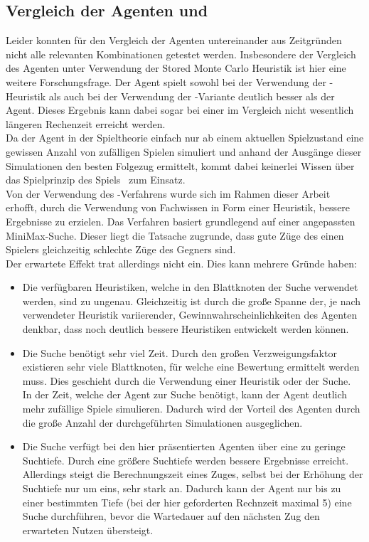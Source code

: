 \subsection{Vergleich der Agenten \mxZitat{\mc} und \mxZitat{\abp}}
\label{subsec:Fazit:AgentenVgl}
Leider konnten für den Vergleich der Agenten untereinander aus Zeitgründen nicht alle relevanten Kombinationen getestet werden. Insbesondere der Vergleich des \mxZitat{\abp} Agenten unter Verwendung der Stored Monte Carlo Heuristik ist hier eine weitere Forschungsfrage.
Der \mxZitat{\mc} Agent spielt sowohl bei der Verwendung der -Heuristik {\color{red}als auch bei der Verwendung der \mc -Variante} deutlich besser als der \mxZitat{\abp} Agent. Dieses Ergebnis kann dabei sogar bei einer im Vergleich nicht wesentlich längeren Rechenzeit erreicht werden.
\\Da der \mxZitat{\mc} Agent in der Spieltheorie einfach nur ab einem aktuellen Spielzustand eine gewissen Anzahl von zufälligen Spielen simuliert und anhand der Ausgänge dieser Simulationen den besten Folgezug ermittelt, kommt dabei keinerlei Wissen über das Spielprinzip des Spiels \ot\ zum Einsatz. 
\\Von der Verwendung des \mxZitat{\abab}-Verfahrens wurde sich im Rahmen dieser Arbeit erhofft, durch die Verwendung von Fachwissen in Form einer Heuristik, bessere Ergebnisse zu erzielen. Das Verfahren basiert grundlegend auf einer angepassten MiniMax-Suche. Dieser liegt die Tatsache zugrunde, dass gute Züge des einen Spielers gleichzeitig schlechte Züge des Gegners sind.
\\Der erwartete Effekt trat allerdings nicht ein. Dies kann mehrere Gründe haben:
\begin{itemize}
\item Die verfügbaren Heuristiken, welche in den Blattknoten der \mxZitat{\abp} Suche verwendet werden, sind zu ungenau. Gleichzeitig ist durch die große Spanne der, je nach verwendeter Heuristik variierender, Gewinnwahrscheinlichkeiten des \mxZitat{\abp} Agenten denkbar, dass noch deutlich bessere Heuristiken entwickelt werden können.
\item Die \mxZitat{\abp} Suche benötigt sehr viel Zeit. Durch den großen Verzweigungsfaktor existieren sehr viele Blattknoten, für welche eine Bewertung ermittelt werden muss. Dies geschieht durch die Verwendung einer Heuristik oder der \mxZitat{\mc} Suche.
\\In der Zeit, welche der \mxZitat{\abp} Agent zur Suche benötigt, kann der \mxZitat{\mc} Agent deutlich mehr zufällige Spiele simulieren. Dadurch wird der Vorteil des \mxZitat{\abp} Agenten durch die große Anzahl der durchgeführten Simulationen ausgeglichen.
\item Die \mxZitat{\abp} Suche verfügt bei den hier präsentierten Agenten über eine zu geringe Suchtiefe. Durch eine größere Suchtiefe werden bessere Ergebnisse erreicht. Allerdings steigt die Berechnungszeit eines Zuges, selbst bei der Erhöhung der Suchtiefe nur um eins, sehr stark an. Dadurch kann der Agent nur bis zu einer bestimmten Tiefe (bei der hier geforderten Rechnzeit maximal 5) eine \mxZitat{\abp} Suche durchführen, bevor die Wartedauer auf den nächsten Zug den erwarteten Nutzen übersteigt. 
\end{itemize} 
